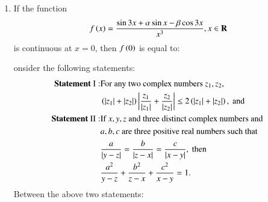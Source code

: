 \documentclass[journal]{IEEEtran}
\numberwithin{equation}{enumi}
\numberwithin{figure}{enumi}
\begin{document}
\begin{enumerate}
    \hfill{}

    \begin{enumerate}
    \end{enumerate}

    \item 
    If the function 
    \begin{align*}
        f\left(x\right) = \frac{\sin{3x} + \alpha\sin{x} - \beta\cos{3x}}{x^3}, x \in \mathbf{R}
    \end{align*}
    is continuous at $x = 0$, then $f\left(0\right)$ is equal to:

    \hfill{}

    \begin{enumerate}
    \end{enumerate}

    onsider the following statements: 
    \begin{align*}
        \textbf{Statement }\mathrm{I:} & \text{For any two complex numbers } z_1, z_2, \\
        & \left(\left\vert z_1\right\vert + \left\vert z_2\right\vert\right)\left\vert\frac{z_1}{\left\vert z_1\right\vert} + \frac{z_2}{\left\vert z_2\right\vert}\right\vert \leq 2\left(\left\vert z_1\right\vert + \left\vert z_2\right\vert\right), \text{ and }\\
        \textbf{Statement }\mathrm{II:} & \text{If } x, y, z \text{ and three distinct complex numbers and } \\
        & a, b, c \text{ are three positive real numbers such that } \\
        & \frac{a}{\left\vert y - z\right\vert} = \frac{b}{\left\vert z - x\right\vert} = \frac{c}{\left\vert x - y\right\vert}, \text{ then} \\
        & \frac{a^2}{y - z} + \frac{b^2}{z - x} + \frac{c^2}{x - y} = 1.
    \end{align*}
    Between the above two statements: 


\end{enumerate}
\end{document}
